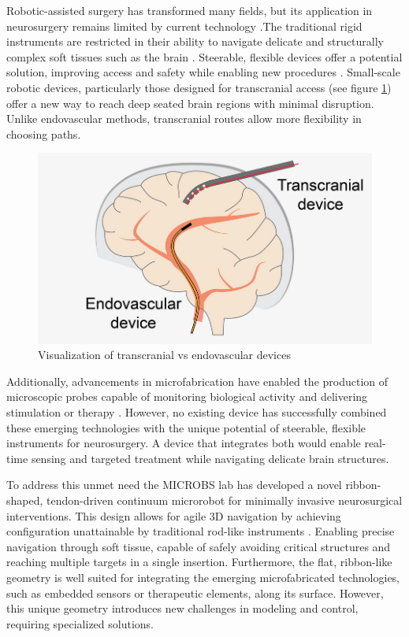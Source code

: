 Robotic-assisted surgery has transformed many fields, but its application in neurosurgery remains limited by current technology \cite{doulgeris_robotics_2015}.The traditional rigid instruments are restricted in their ability to navigate delicate and structurally complex soft tissues such as the brain \cite{noseda_flat_2024}. Steerable, flexible devices offer a potential solution, improving access and safety while enabling new procedures \cite{da_veiga_challenges_2020}. Small-scale robotic devices, particularly those designed for transcranial access (see figure \ref{fig:transcranialvsendocascular}) offer a new way to reach deep seated brain regions with minimal disruption. Unlike endovascular methods, transcranial routes allow more flexibility in choosing paths.
\begin{figure} [H]
    \centering
    \includegraphics[width=0.8\linewidth]{images/brain surgery/43577_2023_644_Figa_HTML.png}
    \caption{Visualization of transcranial vs endovascular devices}
    \label{fig:transcranialvsendocascular}
\end{figure}

Additionally, advancements in microfabrication have enabled the production of microscopic probes capable of monitoring biological activity and delivering stimulation or therapy \cite{chen_neural_2017} \cite{frank_next-generation_2019}.  However, no existing device has successfully combined these emerging technologies with the unique potential of steerable, flexible instruments for neurosurgery. A device that integrates both would enable real-time sensing and targeted treatment while navigating delicate brain structures.

To address this unmet need the MICROBS lab has developed a novel ribbon-shaped, tendon-driven continuum microrobot for minimally invasive neurosurgical interventions. This design allows for agile 3D navigation by achieving configuration unattainable by traditional rod-like instruments \cite{noseda_flat_2024}. Enabling precise navigation through soft tissue, capable of safely avoiding critical structures and reaching multiple targets in a single insertion.  Furthermore, the flat, ribbon-like geometry is well suited for integrating the emerging microfabricated technologies, such as embedded sensors or therapeutic elements, along its surface. However, this unique geometry introduces new challenges in modeling and control, requiring specialized solutions. 

